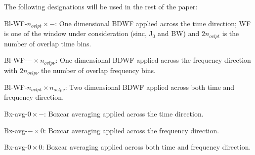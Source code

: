 \documentclass[useAMS,usenatbib]{mn2e}
\begin{document}
The following designations will be used in the rest of the paper:

Bl-WF-$n_{ovlpt}\times -$: One dimensional BDWF applied across the time direction; WF is one of the window under 
consideration (sinc, J$_0$ and BW) and $2n_{ovlpt}$ is the number of overlap time bins.

Bl-WF-$-\times n_{ovlp\nu}$: One dimensional BDWF applied across the frequency direction with $2n_{ovlp\nu}$ the number of overlap 
frequency bins.

Bl-WF-$n_{ovlpt}\times n_{ovlp\nu}$: Two dimensional BDWF applied across both time and frequency direction.

Bx-avg-$0\times -$: Boxcar averaging applied across the time direction.

Bx-avg-$-\times 0$: Boxcar averaging applied across the frequency direction. 

Bx-avg-$0\times 0$: Boxcar averaging applied across both time and frequency direction.
\end{document}
